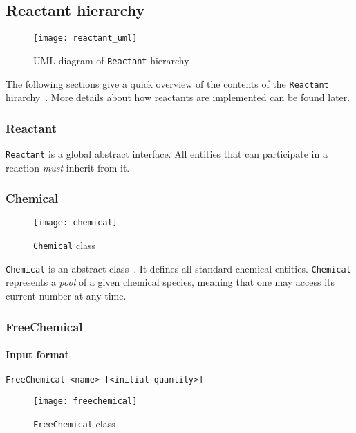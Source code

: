 
\subsection{Reactant hierarchy}

\begin{figure}[!h]
  \centering
  \texttt{[image: reactant\_uml]}
  \caption{UML diagram of \texttt{Reactant} hierarchy}
  \label{fig:reactant_uml}
\end{figure}

The following sections give a quick overview of the contents of the \texttt{Reactant} hirarchy~. More details about how reactants are implemented can be found later.

\subsubsection{Reactant}

\texttt{Reactant} is a global abstract interface. All entities that can participate in a reaction \emph{must} inherit from it.

\subsubsection{Chemical}

\begin{figure}[!h]
  \centering
  \texttt{[image: chemical]}
  \caption{\texttt{Chemical} class}
  \label{fig:chemical}
\end{figure}

\texttt{Chemical} is an abstract class~. It defines all standard chemical entities. \texttt{Chemical} represents a \emph{pool} of a given chemical species, meaning that one may access its current number at any time.

\subsubsection{FreeChemical}

\paragraph{Input format}
\begin{verbatim}
FreeChemical <name> [<initial quantity>]
\end{verbatim}

\begin{figure}[!h]
  \centering
  \texttt{[image: freechemical]}
  \caption{\texttt{FreeChemical} class}
  \label{fig:free_chemical}
\end{figure}

